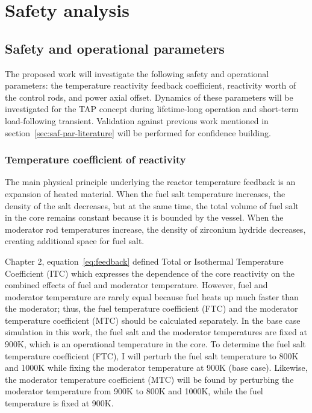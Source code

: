\chapter[Safety analysis]{Safety analysis}

\section{Safety and operational parameters} \label{sec:safety-param}
The proposed work will investigate the following safety and operational 
parameters: the temperature reactivity feedback coefficient, reactivity worth 
of the control rods, and power axial offset. Dynamics of these parameters will 
be investigated for the \gls{TAP} concept during lifetime-long operation and 
short-term load-following transient. Validation against previous work 
mentioned in section~\ref{sec:saf-par-literature} will be performed for 
confidence building.
\subsection{Temperature coefficient of reactivity}
The main physical principle underlying the reactor temperature feedback is an 
expansion of heated material. When the fuel salt temperature increases, the 
density of the salt decreases, but at the same time, the total volume of fuel 
salt in the core remains constant because it is bounded by the vessel. When 
the moderator rod temperatures increase, the density of zirconium hydride 
decreases, creating additional space for fuel salt. 

Chapter 2, equation~\ref{eq:feedback} defined Total or Isothermal Temperature 
Coefficient (ITC) which expresses the dependence of the core reactivity on the 
combined effects of fuel and moderator temperature. However, fuel and 
moderator temperature are rarely equal because fuel heats up much faster than 
the moderator; thus, the fuel temperature coefficient (FTC) and the moderator 
temperature coefficient (MTC) should be calculated separately. In the base 
case simulation in this work, the fuel salt and the moderator temperatures are 
fixed at 900K, which is an operational temperature in the core. To determine 
the fuel salt temperature coefficient (FTC), I will perturb the fuel salt 
temperature to 800K and 1000K while fixing the moderator temperature at 900K 
(base case). Likewise, the moderator temperature coefficient (MTC) will be 
found by perturbing the moderator temperature from 900K to 800K and 1000K, 
while the fuel temperature is fixed at 900K. 

